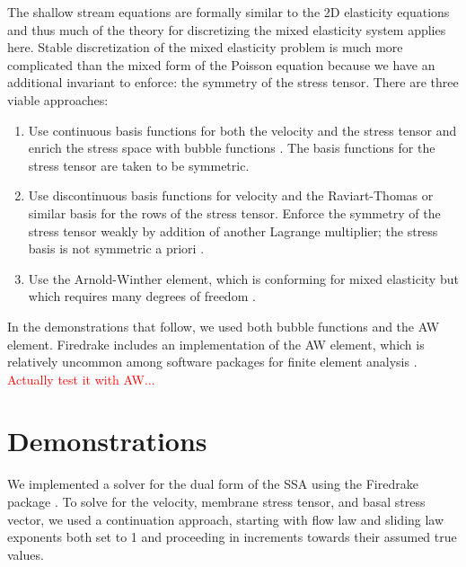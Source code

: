 \documentclass{article}
\theoremstyle{definition}
\theoremstyle{plain}
\begin{document}
The shallow stream equations are formally similar to the 2D elasticity equations and thus much of the theory for discretizing the mixed elasticity system applies here.
Stable discretization of the mixed elasticity problem is much more complicated than the mixed form of the Poisson equation because we have an additional invariant to enforce: the symmetry of the stress tensor.
There are three viable approaches:
\begin{enumerate}
    \item Use continuous basis functions for both the velocity and the stress tensor and enrich the stress space with bubble functions \citep{brezzi1993mixed}.
        The basis functions for the stress tensor are taken to be symmetric.
    \item Use discontinuous basis functions for velocity and the Raviart-Thomas or similar basis for the rows of the stress tensor.
        Enforce the symmetry of the stress tensor weakly by addition of another Lagrange multiplier; the stress basis is not symmetric a priori \citep{arnold1984peers}.
    \item Use the Arnold-Winther element, which is conforming for mixed elasticity but which requires many degrees of freedom \citep{arnold2002mixed}.
\end{enumerate}
In the demonstrations that follow, we used both bubble functions and the AW element.
Firedrake includes an implementation of the AW element, which is relatively uncommon among software packages for finite element analysis \citep{aznaran2021transformations}.
\textcolor{red}{Actually test it with AW...}


\section{Demonstrations}

We implemented a solver for the dual form of the SSA using the Firedrake package \citep{FiredrakeUserManual}.
To solve for the velocity, membrane stress tensor, and basal stress vector, we used a continuation approach, starting with flow law and sliding law exponents both set to 1 and proceeding in increments towards their assumed true values.
\end{document}
